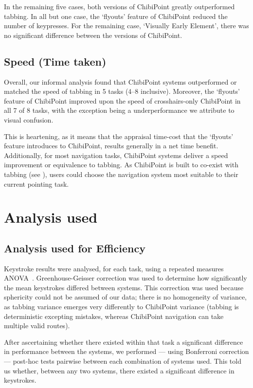 \documentclass[11pt,openright,a4paper]{report}
\begin{document}
In the remaining five cases, both versions of ChibiPoint greatly outperformed tabbing. In all but one case, the `flyouts' feature of ChibiPoint reduced the number of keypresses. For the remaining case, `Visually Early Element', there was no significant difference between the versions of ChibiPoint.
\subsection{Speed (Time taken)}
Overall, our informal analysis found that ChibiPoint systems outperformed or matched the speed of tabbing in 5 tasks (4--8 inclusive). Moreover, the `flyouts' feature of ChibiPoint improved upon the speed of crosshairs-only ChibiPoint in all 7 of 8 tasks, with the exception being a underperformance we attribute to visual confusion.

This is heartening, as it means that the appraisal time-cost that the `flyouts' feature introduces to ChibiPoint, results generally in a net time benefit. Additionally, for most navigation tasks, ChibiPoint systems deliver a speed improvement or equivalence to tabbing. As ChibiPoint is built to co-exist with tabbing (see ), users could choose the navigation system most suitable to their current pointing task.

\section{Analysis used}
\subsection{Analysis used for Efficiency}
Keystroke results were analysed, for each task, using a repeated measures ANOVA~\cite{harris2008designing}. Greenhouse-Geisser correction was used to determine how significantly the mean keystrokes differed between systems. This correction was used because sphericity could not be assumed of our data; there is no homogeneity of variance, as tabbing variance emerges very differently to ChibiPoint variance (tabbing is deterministic excepting mistakes, whereas ChibiPoint navigation can take multiple valid routes).

After ascertaining whether there existed within that task a significant difference in performance between the systems, we performed --- using Bonferroni correction --- post-hoc tests pairwise between each combination of systems used. This told us whether, between any two systems, there existed a significant difference in keystrokes.
\end{document}

